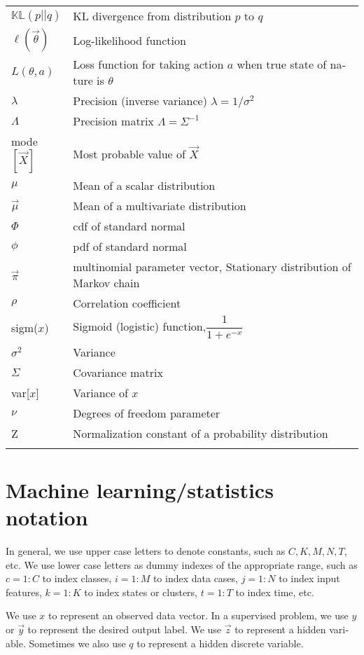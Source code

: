 {\begin{english}
\begin{longtable}{ll}
$\mathbb{KL}(p||q)$ & KL divergence from distribution $p$ to $q$\\
$\ell(\vec{\theta})$ & Log-likelihood function\\
$L(\theta,a)$ & Loss function for taking action $a$ when true state of nature is $\theta$\\
$\lambda$ & Precision (inverse variance) $\lambda=1/\sigma^2$\\
$\Lambda$ & Precision matrix $\Lambda=\Sigma^{-1}$\\
mode$[\vec X]$ & Most probable value of $\vec X$\\
$\mu$ & Mean of a scalar distribution\\
$\vec{\mu}$ & Mean of a multivariate distribution\\
$\Phi$ & cdf of standard normal\\
$\phi$ & pdf of standard normal\\
$\vec{\pi}$ & multinomial parameter vector, Stationary distribution of Markov chain\\
$\rho$ & Correlation coefficient \\
sigm($x$) & Sigmoid (logistic) function,$\dfrac{1}{1+e^{-x}}$\\
$\sigma^2$ & Variance\\
$\Sigma$ & Covariance matrix\\
var[$x$] & Variance of $x$\\
$\nu$ & Degrees of freedom parameter\\
Z & Normalization constant of a probability distribution\\
\noalign{\smallskip}\hline\noalign{\smallskip}
\end{longtable}

\section*{Machine learning/statistics notation}
In general, we use upper case letters to denote constants, such as $C, K, M, N, T$, etc. We use lower case letters as dummy indexes of the appropriate range, such as $c=1:C$ to index classes, $i=1:M$ to index data cases, $j=1:N$ to index input features, $k=1:K$ to index states or clusters, $t=1:T$ to index time, etc.

We use $x$ to represent an observed data vector. In a supervised problem, we use $y$ or $\vec{y}$ to represent the desired output label. We use $\vec{z}$ to represent a hidden variable. Sometimes we also use $q$ to represent a hidden discrete variable.


\end{english}}
